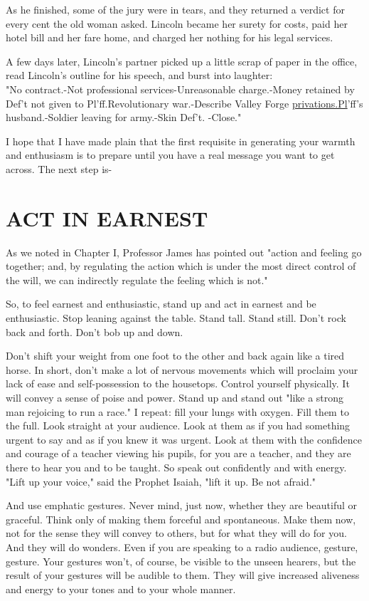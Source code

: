 \documentclass[10pt]{article}
\begin{document}
As he finished, some of the jury were in tears, and they returned a verdict for every cent the old woman asked. Lincoln became her surety for costs, paid her hotel bill and her fare home, and charged her nothing for his legal services.

A few days later, Lincoln's partner picked up a little scrap of paper in the office, read Lincoln's outline for his speech, and burst into laughter:\\
"No contract.-Not professional services-Unreasonable charge.-Money retained by Def't not given to Pl'ff.Revolutionary war.-Describe Valley Forge \href{http://privations.Pl}{privations.Pl}'ff's husband.-Soldier leaving for army.-Skin Def't. -Close."

I hope that I have made plain that the first requisite in generating your warmth and enthusiasm is to prepare until you have a real message you want to get across. The next step is-

\section*{ACT IN EARNEST}
As we noted in Chapter I, Professor James has pointed out "action and feeling go together; and, by regulating the action which is under the most direct control of the will, we can indirectly regulate the feeling which is not."

So, to feel earnest and enthusiastic, stand up and act in earnest and be enthusiastic. Stop leaning against the table. Stand tall. Stand still. Don't rock back and forth. Don't bob up and down.

Don't shift your weight from one foot to the other and back again like a tired horse. In short, don't make a lot of nervous movements which will proclaim your lack of ease and self-possession to the housetops. Control yourself physically. It will convey a sense of poise and power. Stand up and stand out "like a strong man rejoicing to run a race." I repeat: fill your lungs with oxygen. Fill them to the full. Look straight at your audience. Look at them as if you had something urgent to say and as if you knew it was urgent. Look at them with the confidence and courage of a teacher viewing his pupils, for you are a teacher, and they are there to hear you and to be taught. So speak out confidently and with energy. "Lift up your voice," said the Prophet Isaiah, "lift it up. Be not afraid."

And use emphatic gestures. Never mind, just now, whether they are beautiful or graceful. Think only of making them forceful and spontaneous. Make them now, not for the sense they will convey to others, but for what they will do for you. And they will do wonders. Even if you are speaking to a radio audience, gesture, gesture. Your gestures won't, of course, be visible to the unseen hearers, but the result of your gestures will be audible to them. They will give increased aliveness and energy to your tones and to your whole manner.
\end{document}
